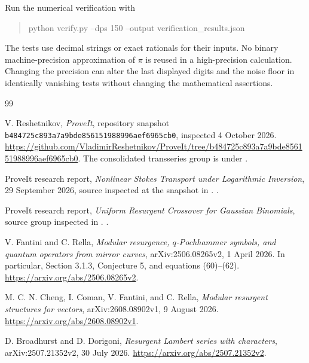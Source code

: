 \documentclass[11pt,a4paper]{article}
\numberwithin{equation}{section}
\theoremstyle{definition}
\theoremstyle{remark}
\begin{document}
Run the numerical verification with
\begin{quote}\small\ttfamily
python verify.py --dps 150 --output verification\_results.json
\end{quote}
The tests use decimal strings or exact rationals for their inputs.
No binary machine-precision approximation of $\pi$ is reused in a
high-precision calculation. Changing the precision can alter the
last displayed digits and the noise floor in identically vanishing
tests without changing the mathematical assertions.

\begin{thebibliography}{99}

V. Reshetnikov, \emph{ProveIt}, repository snapshot
\texttt{b484725c893a7a9bde856151988996aef6965cb0}, inspected
4 October 2026.\newline
\url{https://github.com/VladimirReshetnikov/ProveIt/tree/b484725c893a7a9bde856151988996aef6965cb0}.
The consolidated transseries group is under
.

ProveIt research report, \emph{Nonlinear Stokes Transport under
Logarithmic Inversion}, 29 September 2026, source inspected at the
snapshot in \cite{repo}.\newline
{}.

ProveIt research report, \emph{Uniform Resurgent Crossover for Gaussian
Binomials}, source group inspected in \cite{repo}.\newline
{}.

V. Fantini and C. Rella,
\emph{Modular resurgence, $q$-Pochhammer symbols, and quantum operators
from mirror curves}, arXiv:2506.08265v2, 1 April 2026.
In particular, Section 3.1.3, Conjecture 5, and equations (60)--(62).\newline
\url{https://arxiv.org/abs/2506.08265v2}.

M. C. N. Cheng, I. Coman, V. Fantini, and C. Rella,
\emph{Modular resurgent structures for vectors},
arXiv:2608.08902v1, 9 August 2026.\newline
\url{https://arxiv.org/abs/2608.08902v1}.

D. Broadhurst and D. Dorigoni,
\emph{Resurgent Lambert series with characters},
arXiv:2507.21352v2, 30 July 2026.\newline
\url{https://arxiv.org/abs/2507.21352v2}.


\end{thebibliography}
\end{document}
